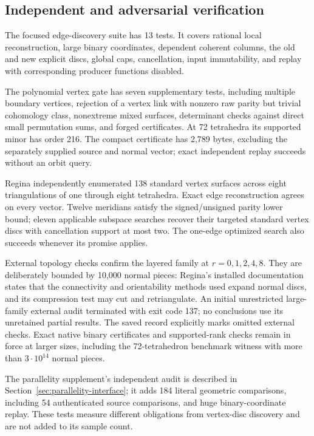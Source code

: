 \subsection{Independent and adversarial verification}

The focused edge-discovery suite has 13 tests. It covers rational local
reconstruction, large binary coordinates, dependent coherent columns,
the old and new explicit discs, global caps, cancellation, input
immutability, and replay with corresponding producer functions disabled.

The polynomial vertex gate has seven supplementary tests, including
multiple boundary vertices, rejection of a vertex link with nonzero raw
parity but trivial cohomology class, nonextreme mixed surfaces, determinant
checks against direct small permutation sums, and forged certificates.
At 72 tetrahedra its supported minor has order 216. The compact
certificate has 2,789 bytes, excluding the separately supplied source and
normal vector; exact independent replay succeeds without an orbit query.

Regina independently enumerated 138 standard vertex surfaces across
eight triangulations of one through eight tetrahedra. Exact edge
reconstruction agrees on every vector. Twelve meridians satisfy the
signed/unsigned parity lower bound; eleven applicable subspace searches
recover their targeted standard vertex discs with cancellation support
at most two. The one-edge optimized search also succeeds whenever its
promise applies.

External topology checks confirm the layered family at
$r=0,1,2,4,8$. They are deliberately bounded by 10,000 normal pieces:
Regina's installed documentation states that the connectivity and
orientability methods used expand normal discs, and its compression
test may cut and retriangulate. An initial unrestricted large-family
external audit terminated with exit code 137; no conclusions use its
unretained partial results. The saved record explicitly marks omitted
external checks. Exact native binary certificates and supported-rank
checks remain in force at larger sizes, including the 72-tetrahedron
benchmark witness with more than $3\cdot10^{14}$ normal pieces.

The parallelity supplement's independent audit is described in
Section~\ref{sec:parallelity-interface}; it adds 184 literal geometric
comparisons, including 54 authenticated source comparisons, and huge
binary-coordinate replay. These tests measure different obligations
from vertex-disc discovery and are not added to its sample count.

